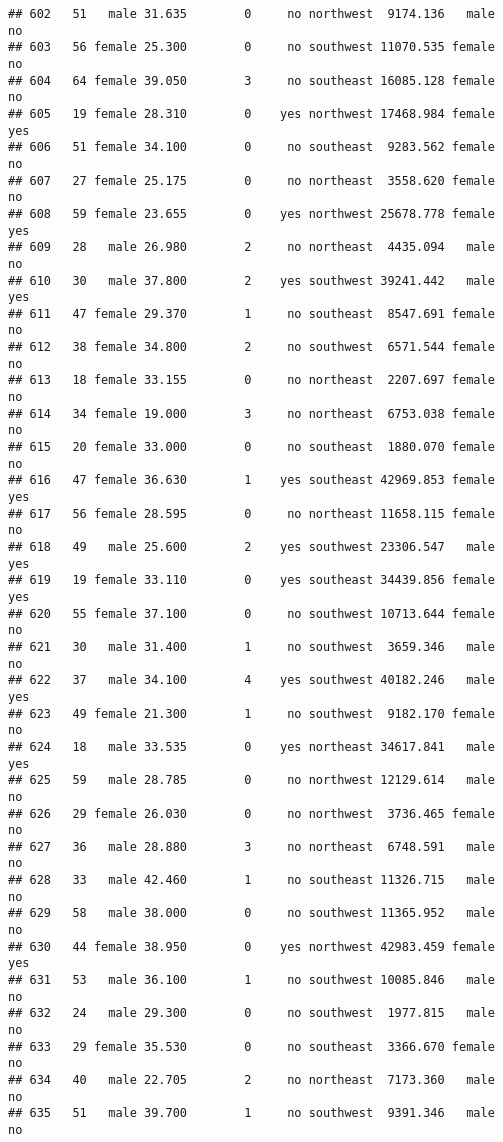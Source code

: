 \documentclass[
]{article}
\begin{document}
\begin{verbatim}
## 602   51   male 31.635        0     no northwest  9174.136   male       no
## 603   56 female 25.300        0     no southwest 11070.535 female       no
## 604   64 female 39.050        3     no southeast 16085.128 female       no
## 605   19 female 28.310        0    yes northwest 17468.984 female      yes
## 606   51 female 34.100        0     no southeast  9283.562 female       no
## 607   27 female 25.175        0     no northeast  3558.620 female       no
## 608   59 female 23.655        0    yes northwest 25678.778 female      yes
## 609   28   male 26.980        2     no northeast  4435.094   male       no
## 610   30   male 37.800        2    yes southwest 39241.442   male      yes
## 611   47 female 29.370        1     no southeast  8547.691 female       no
## 612   38 female 34.800        2     no southwest  6571.544 female       no
## 613   18 female 33.155        0     no northeast  2207.697 female       no
## 614   34 female 19.000        3     no northeast  6753.038 female       no
## 615   20 female 33.000        0     no southeast  1880.070 female       no
## 616   47 female 36.630        1    yes southeast 42969.853 female      yes
## 617   56 female 28.595        0     no northeast 11658.115 female       no
## 618   49   male 25.600        2    yes southwest 23306.547   male      yes
## 619   19 female 33.110        0    yes southeast 34439.856 female      yes
## 620   55 female 37.100        0     no southwest 10713.644 female       no
## 621   30   male 31.400        1     no southwest  3659.346   male       no
## 622   37   male 34.100        4    yes southwest 40182.246   male      yes
## 623   49 female 21.300        1     no southwest  9182.170 female       no
## 624   18   male 33.535        0    yes northeast 34617.841   male      yes
## 625   59   male 28.785        0     no northwest 12129.614   male       no
## 626   29 female 26.030        0     no northwest  3736.465 female       no
## 627   36   male 28.880        3     no northeast  6748.591   male       no
## 628   33   male 42.460        1     no southeast 11326.715   male       no
## 629   58   male 38.000        0     no southwest 11365.952   male       no
## 630   44 female 38.950        0    yes northwest 42983.459 female      yes
## 631   53   male 36.100        1     no southwest 10085.846   male       no
## 632   24   male 29.300        0     no southwest  1977.815   male       no
## 633   29 female 35.530        0     no southeast  3366.670 female       no
## 634   40   male 22.705        2     no northeast  7173.360   male       no
## 635   51   male 39.700        1     no southwest  9391.346   male       no

\end{verbatim}
\end{document}
